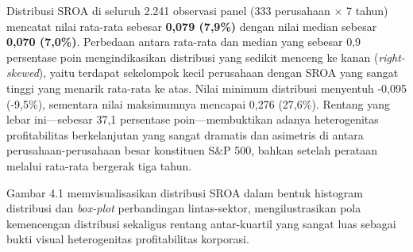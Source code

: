 \documentclass[12pt,a4paper]{article}
\begin{document}
Distribusi SROA di seluruh 2.241 observasi panel (333 perusahaan
\(\times\) 7 tahun) mencatat nilai rata-rata sebesar \textbf{0,079
(7,9\%)} dengan nilai median sebesar \textbf{0,070 (7,0\%)}. Perbedaan
antara rata-rata dan median yang sebesar 0,9 persentase poin
mengindikasikan distribusi yang sedikit menceng ke kanan
(\emph{right-skewed}), yaitu terdapat sekelompok kecil perusahaan dengan
SROA yang sangat tinggi yang menarik rata-rata ke atas. Nilai minimum
distribusi menyentuh -0,095 (-9,5\%), sementara nilai maksimumnya
mencapai 0,276 (27,6\%). Rentang yang lebar ini---sebesar 37,1
persentase poin---membuktikan adanya heterogenitas profitabilitas
berkelanjutan yang sangat dramatis dan asimetris di antara
perusahaan-perusahaan besar konstituen S\&P 500, bahkan setelah perataan
melalui rata-rata bergerak tiga tahun.

Gambar 4.1 memvisualisasikan distribusi SROA dalam bentuk histogram
distribusi dan \emph{box-plot} perbandingan lintas-sektor,
mengilustrasikan pola kemencengan distribusi sekaligus rentang
antar-kuartil yang sangat luas sebagai bukti visual heterogenitas
profitabilitas korporasi.
\end{document}
